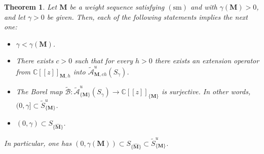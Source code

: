 \documentclass[11pt,a4paper]{article}
\theoremstyle{plain}
\newtheorem{theorem}{Theorem}[section]
\theoremstyle{definition}
\numberwithin{equation}{section}
\newcommand{\C}{\mathbb{C}}
\newcommand{\M}{{\boldsymbol{M}}}
\newcommand{\hM}{\widehat{{\boldsymbol{M}}}}
\def\ga{\gamma}
\newcommand{\sm}{\operatorname{(sm)}}
\begin{document}
\begin{theorem}\label{Theorem-surjectivity-logcondition}
	Let $\M$ be a weight sequence satisfying $\sm$ and
with $\ga(\M)>0$, and let $\ga>0$ be given.
Then, each of the following statements implies the next one:
	\begin{itemize}
		\item[(i)] $\ga<\ga(\M)$.
		\item[(ii)] There exists $c>0$ such that for every $h>0$ there exists an extension operator from $\C[[z]]_{\M,h}$ into $\widetilde{\mathcal{A}}^u_{\M,ch}(S_{\ga})$.
		\item[(iii)] The Borel map $\widetilde{\mathcal{B}}\colon \widetilde{\mathcal{A}}^u_{\{\M\}}(S_{\ga})\to\C[[z]]_{\{\M\}}$ is surjective. In other words, $(0,\ga]\subset\widetilde{S}_{\{\M\}}^u$.
		\item[(iv)] $(0,\ga)\subset S_{\{\hM\}}$.
	\end{itemize}
In particular, one has $(0,\ga(\M))\subset S_{\{\hM\}}\subset \widetilde{S}_{\{\M\}}^u$.
\end{theorem}
\end{document}
